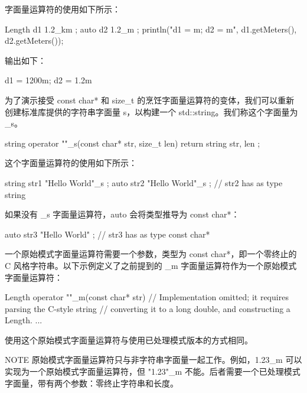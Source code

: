 字面量运算符的使用如下所示：

\begin{cpp}
Length d1 { 1.2_km };
auto d2 { 1.2_m };
println("d1 = {}m; d2 = {}m", d1.getMeters(), d2.getMeters());
\end{cpp}

输出如下：

\begin{shell}
d1 = 1200m; d2 = 1.2m
\end{shell}

为了演示接受 const char* 和 size\_t 的烹饪字面量运算符的变体，我们可以重新创建标准库提供的字符串字面量 s，以构建一个 std::string。我们称这个字面量为 \_s。

\begin{cpp}
string operator ""_s(const char* str, size_t len)
{
    return string { str, len };
}
\end{cpp}

这个字面量运算符的使用如下所示：

\begin{cpp}
string str1 { "Hello World"_s };
auto str2 { "Hello World"_s }; // str2 has as type string
\end{cpp}

如果没有 \_s 字面量运算符，auto 会将类型推导为 const char*：

\begin{cpp}
auto str3 { "Hello World" }; // str3 has as type const char*
\end{cpp}



一个原始模式字面量运算符需要一个参数，类型为 const char*，即一个零终止的 C 风格字符串。以下示例定义了之前提到的 \_m 字面量运算符作为一个原始模式字面量运算符：

\begin{cpp}
Length operator ""_m(const char* str)
{
    // Implementation omitted; it requires parsing the C-style string
    // converting it to a long double, and constructing a Length.
    ...
}
\end{cpp}

使用这个原始模式字面量运算符与使用已处理模式版本的方式相同。

\begin{myNotic}{NOTE}
原始模式字面量运算符只与非字符串字面量一起工作。例如，1.23\_m 可以实现为一个原始模式字面量运算符，但 "1.23"\_m 不能。后者需要一个已处理模式字面量，带有两个参数：零终止字符串和长度。
\end{myNotic}














